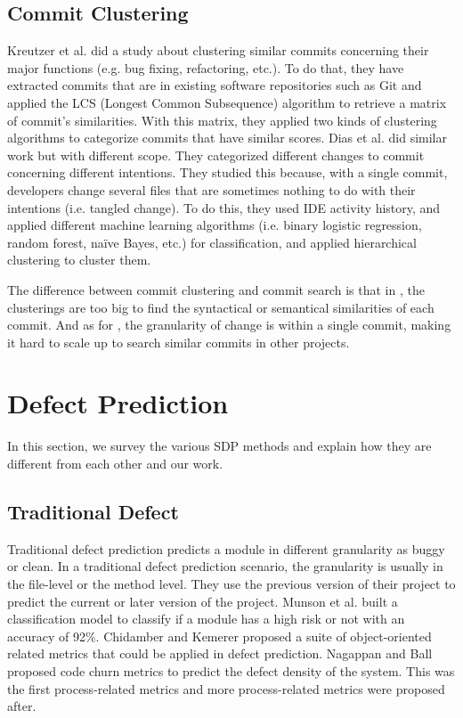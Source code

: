 \subsection{Commit Clustering}
Kreutzer et al. \cite{kreutzer2016automatic} did a study about clustering similar commits concerning their major functions (e.g. bug fixing, refactoring, etc.).
To do that, they have extracted commits that are in existing software repositories such as Git and applied the LCS (Longest Common Subsequence) algorithm to retrieve a matrix of commit's similarities.
With this matrix, they applied two kinds of clustering algorithms to categorize commits that have similar scores.
Dias et al. \cite{dias2015untangling} did similar work but with different scope.
They categorized different changes to commit concerning different intentions.
They studied this because, with a single commit, developers change several files that are sometimes nothing to do with their intentions (i.e. tangled change).
To do this, they used IDE activity history, and applied different machine learning algorithms (i.e. binary logistic regression, random forest, naïve Bayes, etc.) for classification, and applied hierarchical clustering to cluster them.

The difference between commit clustering and commit search is that in \cite{kreutzer2016automatic}, the clusterings are too big to find the syntactical or semantical similarities of each commit. And as for \cite{dias2015untangling}, the granularity of change is within a single commit, making it hard to scale up to search similar commits in other projects.

\section{Defect Prediction}
In this section, we survey the various SDP methods and explain how they are different from each other and our work.

\subsection{Traditional Defect}
Traditional defect prediction predicts a module in different granularity as buggy or clean.
In a traditional defect prediction scenario, the granularity is usually in the file-level or the method level.
They use the previous version of their project to predict the current or later version of the project.
Munson et al. \cite{munson1992detection} built a classification model to classify if a module has a high risk or not with an accuracy of 92\%.
Chidamber and Kemerer \cite{chidamber1994metrics} proposed a suite of object-oriented related metrics that could be applied in defect prediction.
Nagappan and Ball \cite{nagappan2005use} proposed code churn metrics to predict the defect density of the system.
This was the first process-related metrics and more process-related metrics were proposed after.

